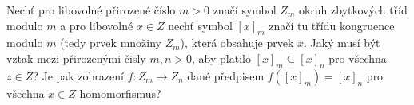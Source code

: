 \subsubsection{}
Nechť pro libovolné přirozené číslo $m>0$ značí symbol $Z_{m}$ okruh zbytkových
tříd modulo $m$ a pro libovolné $x \in Z$ nechť symbol $\left [ x \right ]_{m}$
značí tu třídu kongruence modulo $m$ (tedy prvek množiny $Z_{m}$), která
obsahuje prvek $x$. Jaký musí být vztak mezi přirozenými čisly $m,n>0$, aby
platilo $\left [ x \right ]_{m} \subseteq \left [ x \right ]_{n}$ pro všechna 
$z \in Z$? Je pak zobrazení $f:Z_{m} \rightarrow Z_{n}$ dané předpisem $f(\left [ x
\right ]_{m}) =\left [ x \right ]_{n}$ pro všechna $x \in Z$ homomorfismus?
